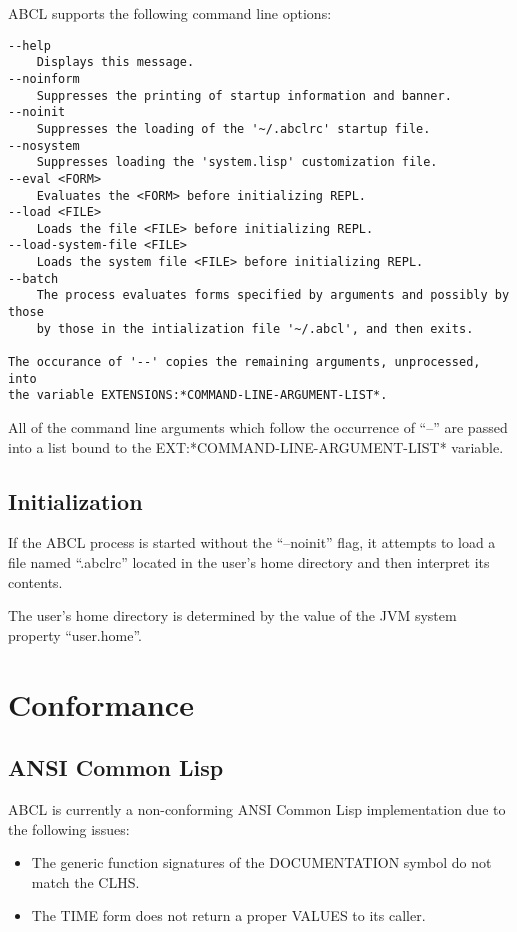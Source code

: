 \documentclass[10pt]{book}
\begin{document}
ABCL supports the following command line options:

\begin{verbatim}
--help
    Displays this message.
--noinform
    Suppresses the printing of startup information and banner.
--noinit
    Suppresses the loading of the '~/.abclrc' startup file.
--nosystem
    Suppresses loading the 'system.lisp' customization file. 
--eval <FORM>
    Evaluates the <FORM> before initializing REPL.
--load <FILE>
    Loads the file <FILE> before initializing REPL.
--load-system-file <FILE>
    Loads the system file <FILE> before initializing REPL.
--batch
    The process evaluates forms specified by arguments and possibly by those
    by those in the intialization file '~/.abcl', and then exits.

The occurance of '--' copies the remaining arguments, unprocessed, into
the variable EXTENSIONS:*COMMAND-LINE-ARGUMENT-LIST*.
\end{verbatim}

All of the command line arguments which follow the occurrence of ``--''
are passed into a list bound to the EXT:*COMMAND-LINE-ARGUMENT-LIST*
variable.

\section{Initialization}

If the ABCL process is started without the ``--noinit'' flag, it
attempts to load a file named ``.abclrc'' located in the user's home
directory and then interpret its contents.  

The user's home directory is determined by the value of the JVM system
property ``user.home''.

\chapter{Conformance}

\section{ANSI Common Lisp}
\textsc{ABCL} is currently a non-conforming ANSI Common Lisp implementation due
to the following issues:

\begin{itemize}
  \item The generic function signatures of the DOCUMENTATION symbol do
    not match the CLHS.
  \item The TIME form does not return a proper VALUES to its caller.
\end{itemize}
\end{document}
